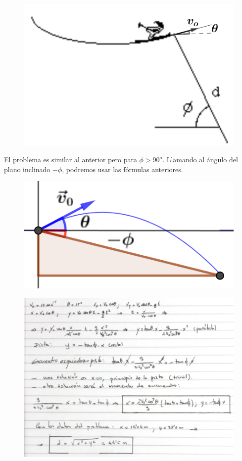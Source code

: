 \begin{multicols}{2}

\begin{figure}[H]
		\centering
		\includegraphics[width=.5\textwidth]{imagenes/imagenes02/T02IM37.png}
		\end{figure}
El problema es similar al anterior pero para $\phi>90^o$. 
Llamando al ángulo del plano inclinado $-\phi$, podremos usar las fórmulas anteriores.

\begin{figure}[H]
		\centering
		\includegraphics[width=.3\textwidth]{imagenes/imagenes02/T02IM38.png}
		\end{figure}

\end{multicols}


\vspace{-3mm}\begin{figure}[H]
		\centering
		\includegraphics[width=1\textwidth]{imagenes/imagenes02/T02IM40.png}
		\end{figure}
		
